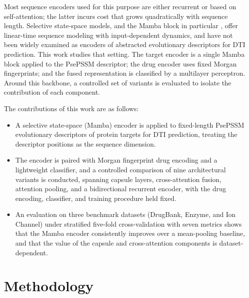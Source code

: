\documentclass[conference]{IEEEtran}
\begin{document}
Most sequence encoders used for this purpose are either recurrent or based on
self-attention; the latter incurs cost that grows quadratically with sequence
length. Selective state-space models, and the Mamba block in particular
\cite{ref_mamba}, offer linear-time sequence modeling with input-dependent
dynamics, and have not been widely examined as encoders of abstracted
evolutionary descriptors for DTI prediction. This work studies that setting. The
target encoder is a single Mamba block applied to the PsePSSM descriptor; the
drug encoder uses fixed Morgan fingerprints; and the fused representation is
classified by a multilayer perceptron. Around this backbone, a controlled set of
variants is evaluated to isolate the contribution of each component.

The contributions of this work are as follows:
\begin{itemize}
\item A selective state-space (Mamba) encoder is applied to fixed-length
PsePSSM evolutionary descriptors of protein targets for DTI prediction, treating
the descriptor positions as the sequence dimension.
\item The encoder is paired with Morgan fingerprint drug encoding and a
lightweight classifier, and a controlled comparison of nine architectural
variants is conducted, spanning capsule layers, cross-attention fusion,
attention pooling, and a bidirectional recurrent encoder, with the drug encoding,
classifier, and training procedure held fixed.
\item An evaluation on three benchmark datasets (DrugBank, Enzyme, and Ion
Channel) under stratified five-fold cross-validation with seven metrics shows
that the Mamba encoder consistently improves over a mean-pooling baseline, and
that the value of the capsule and cross-attention components is
dataset-dependent.
\end{itemize}

\section{Methodology}
\end{document}
